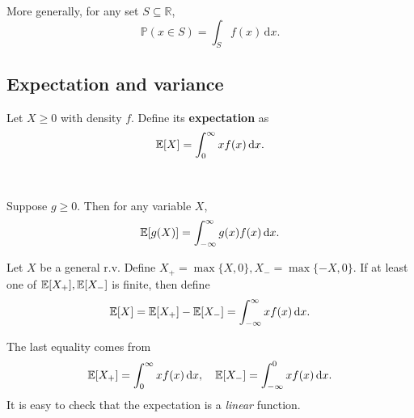 More generally, for any set $ S \subseteq \mathbb{R}  $, 
\[
    \mathbb{P}(x\in S) = \int_{S} f(x) \,\mathrm{d}x.
\]

\begin{center}
\end{center}

\subsection{Expectation and variance}
\begin{definition}
    Let $X\ge 0$ with density $f$. Define its \textbf{expectation} as 
    \[
        {\mathbb{E}}[X] = \int_{0}^{\infty} xf(x) \,\mathrm{d}x.
    \]
\end{definition}\
\begin{note}
    Suppose $g\ge 0$. Then for any variable $X$,
    \[
        {\mathbb{E}}[g(X)]= \int_{-\infty}^{\infty} g(x)f(x) \,\mathrm{d}x.
    \]
\end{note}
\begin{definition}
    Let $X$ be a general r.v. Define $ X_+=\max \{X,0\},X_-=\max \{-X,0\} $. If at least one of $ {\mathbb{E}}[X_+],{\mathbb{E}}[X_-] $ is finite, then define 
    \[
        {\mathbb{E}}[X]={\mathbb{E}}[X_+]-{\mathbb{E}}[X_-] = \int_{-\infty}^{\infty} xf(x) \,\mathrm{d}x.
    \]
\end{definition}
\begin{note}
    The last equality comes from 
    \[
        {\mathbb{E}}[X_+] = \int_{0}^{\infty} xf(x) \,\mathrm{d}x,\quad {\mathbb{E}}[X_-]=\int_{-\infty}^{0} xf(x) \,\mathrm{d}x.
    \]
    It is easy to check that the expectation is a \textit{linear} function.
\end{note}


